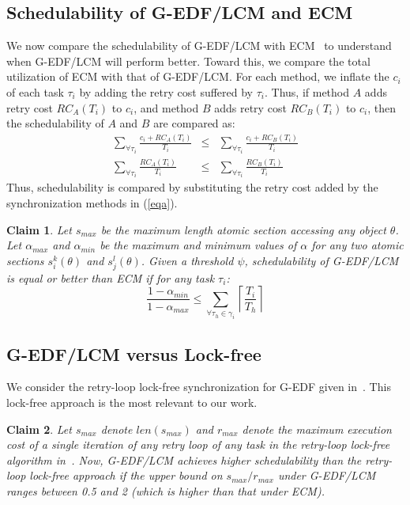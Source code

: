 \documentclass[letter]{sig-alternate}
\newtheorem{clm}{Claim}
\begin{document}
\subsection{Schedulability of G-EDF/LCM and ECM}
\label{performance g-edf-lcm}
We now compare the schedulability of G-EDF/LCM with ECM~\cite{stmconcurrencycontrol:emsoft11} %
to understand when G-EDF/LCM will perform better. 
Toward this, we compare the total utilization of ECM with that of G-EDF/LCM. For each method, we inflate the $c_i$ of each task $\tau_i$ by adding the retry cost suffered by $\tau_i$. Thus, if method $A$ adds retry cost $RC_A(T_i)$ to $c_i$, and method $B$ adds retry cost $RC_B(T_i)$ to $c_i$, then the schedulability of $A$ and $B$ are compared as:
\begin{eqnarray}
\sum_{\forall \tau_{i}}\frac{c_{i}+RC_A(T_{i})}{T_{i}} & \le & \sum_{\forall \tau_{i}}\frac{c_{i}+RC_B(T_{i})}{T_{i}}\nonumber\\
\sum_{\forall \tau_{i}}\frac{RC_A(T_{i})}{T_{i}} & \le & \sum_{\forall \tau_{i}}\frac{RC_B(T_{i})}{T_{i}}
\label{eqa}\end{eqnarray}
Thus, schedulability is compared by substituting the retry cost added by the synchronization methods in (\ref{eqa}).

\begin{clm}\label{lcm versus ecm}
Let $s_{max}$ be the maximum length atomic section accessing any object $\theta$. Let $\alpha_{max}$ and $\alpha_{min}$ be the maximum and minimum values of $\alpha$ for any two atomic sections $s_i^k(\theta)$ and $s_j^l(\theta)$. Given a threshold $\psi$, schedulability of G-EDF/LCM is equal or better than ECM if for any task $\tau_i$:
\begin{equation}
\frac{1-\alpha_{min}}{1-\alpha_{max}} \le \sum_{\forall \tau_h \in \gamma_i}\left\lceil\frac{T_i}{T_h}\right\rceil
\label{edf-lcm-ecm}\end{equation}
\end{clm}

\subsection{G-EDF/LCM versus Lock-free}
\label{gedf-lcm-lock-free}
We consider the retry-loop lock-free synchronization for G-EDF given in~\cite{key-5}. This lock-free approach is the most relevant to our work. 

\begin{clm}\label{gedf-lcm-lock-free_clm} 
Let $s_{max}$ denote $len(s_{max})$ and $r_{max}$ denote the maximum execution cost of a single iteration of any retry loop of any task in the retry-loop lock-free algorithm in~\cite{key-5}. Now, G-EDF/LCM achieves higher schedulability than the retry-loop lock-free approach if the upper bound on $s_{max}/r_{max}$ under G-EDF/LCM ranges between 0.5 and 2 (which is higher than that under  ECM). 
\end{clm}
\end{document}
